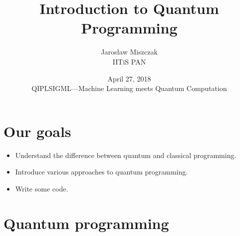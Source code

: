 \documentclass{beamer}
\title[A]{Introduction to Quantum Programming}
\author{Jaros\l aw Miszczak\\ IITiS PAN}
\date{April 27, 2018\\ QIPLSIGML---Machine Learning meets Quantum Computation}
\begin{document}
\begin{frame}{}
   \maketitle 
\end{frame}

\begin{frame}{}
  \tableofcontents[hideallsubsections]
\end{frame}

\section{Our goals}

\begin{frame}{\insertsection}
    \begin{itemize}
        \item<1-> Understand the difference between quantum and classical 
        programming.
        \item<2-> Introduce various approaches to quantum programming.
        \item<3-> Write some code.\\ 
    \end{itemize}
\end{frame}


\section{Quantum programming}

\begin{frame}
    \begin{center}
        {\color{iitis-orange} \LARGE \insertsection}
    \end{center}
\end{frame}
\end{document}
